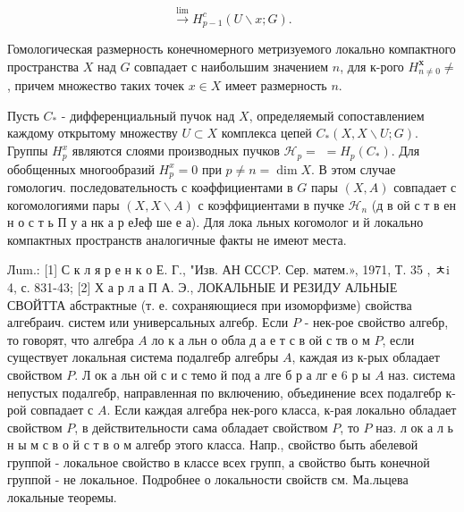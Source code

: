 \documentclass[10pt]{article}
\begin{document}
\[

\stackrel{\lim }{\longrightarrow} H_{p-1}^{c}(U \backslash x ; G) .

\]



Гомологическая размерность конечномерного метризуемого локально компактного пространства $X$ над $G$ совпадает с наибольшим значением $n$, для к-рого $H_{n \neq 0}^{\boldsymbol{x}} \neq$, причем множество таких точек $x \in X$ имеет размерность $n$.



Пусть $C_{*}$ - дифференциальный пучок над $X$, определяемый сопоставлением каждому открытому множеству $U \subset X$ комплекса цепей $C_{*}(X, X \backslash U ; G)$. Группы $H_{p}^{x}$ являются слоями производных пучков $\mathscr{H}_{p}=$ $=H_{p}\left(C_{*}\right)$. Для обобщенных многообразий $H_{p}^{x}=0$ при $p \neq n=\operatorname{dim} X$. В этом случае гомологич. последовательность с коәффициентами в $G$ пары $(X, A)$ совпадает с когомологиями пары $(X, X \backslash A)$ с коэффициентами в пучке $\mathscr{H}_{n}$ (д в ой с т в ен н о с т ь П у а нк а р еЈеф ше е а). Для лока льных когомолог и й локально компактных пространств аналогичные факты не имеют места.



Лum.: [1] С к л я р е н к о Е. Г., "Изв. АН ССCP. Сер. матем.», 1971, Т. 35 , ㅊi 4, с. 831-43; [2] Х а р л а П А. Э., ЛОКАЛЬНЫЕ И РЕЗИДУ АЛЬНЫЕ СВОЙТТА абстрактные (т. е. сохраняющиеся при изоморфизме) свойства алгебраич. систем или универсальных алгебр. Если $P$ - нек-рое свойство алгебр, то говорят, что алгебра $A$ ло к а льн о обла д а е т с в ой с тв о м $P$, если существует локальная система подалгебр алгебры $A$, каждая из к-рых обладает свойством $P$. Л ок а льн ой с и с темо й под а лге б р а лг е 6 р ы $A$ наз. система непустых подалгебр, направленная по включению, объединение всех подалгебр к-рой совпадает с $A$. Если каждая алгебра нек-рого класса, к-рая локально обладает свойством $P$, в действительности сама обладает свойством $P$, то $P$ наз. л ок а л ь н ы м с в о й с т в о м алгебр этого класса. Напр., свойство быть абелевой группой - локальное свойство в классе всех групп, а свойство быть конечной группой - не локальное. Подробнее о локальности свойств см. Ма.льцева локальные теоремы.
\end{document}
